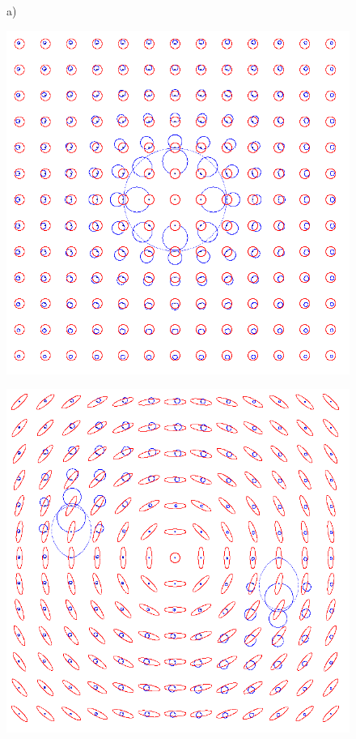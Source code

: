 \documentclass{scrartcl}
\begin{document}
\begin{figure}[!t]
\centering
   a)
  \begin{minipage}{0.25\textwidth}
  \centering
    \includegraphics[height=0.8\textwidth]{isotropic-all-center.png}
    \label{a)}
  \end{minipage}
  \begin{minipage}{0.25\textwidth}
  \centering
    \includegraphics[height=0.8\textwidth]{rings-two-special1.png}
    \label{b)}
  \end{minipage}
  \begin{minipage}{0.25\textwidth}
    \centering

\end{minipage}
\end{figure}
\end{document}
